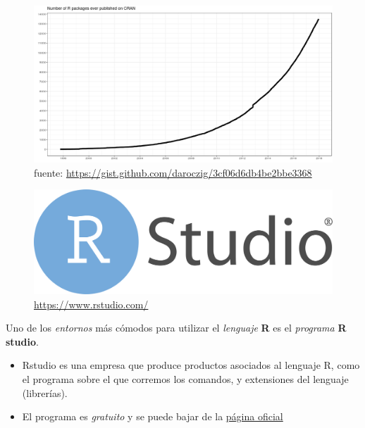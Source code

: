 \documentclass[]{book}
\begin{document}
\begin{figure}
\centering
\includegraphics[width=10.41667in,height=\textheight]{img/number-of-submitted-packages-to-CRAN.png}
\caption{fuente: \url{https://gist.github.com/daroczig/3cf06d6db4be2bbe3368}}
\end{figure}

\begin{figure}
\centering
\includegraphics[width=7.8125in,height=\textheight]{img/RStudio-Logo-Flat.png}
\caption{\url{https://www.rstudio.com/}}
\end{figure}

Uno de los \emph{entornos} más cómodos para utilizar el \emph{lenguaje} \textbf{R} es el \emph{programa} \textbf{R studio}.

\begin{itemize}
\item
  Rstudio es una empresa que produce productos asociados al lenguaje R, como el programa sobre el que corremos los comandos, y extensiones del lenguaje (librerías).
\item
  El programa es \emph{gratuito} y se puede bajar de la
  \href{https://www.rstudio.com/}{página oficial}
\end{itemize}
\end{document}
